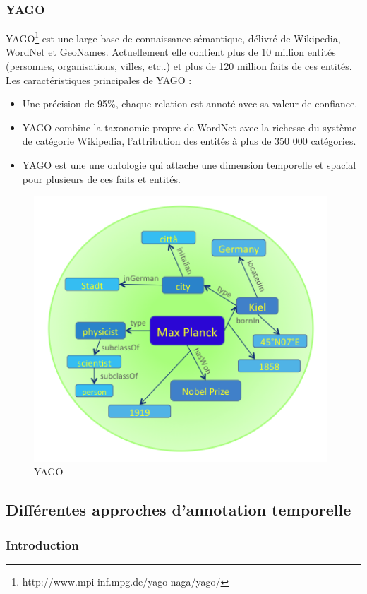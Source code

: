 \documentclass[12pt,a4	]{report}
\begin{document}
\subsubsection*{YAGO}
YAGO\footnote{http://www.mpi-inf.mpg.de/yago-naga/yago/} est une large base de connaissance sémantique, délivré de Wikipedia, WordNet et GeoNames. Actuellement elle contient plus de 10 million entités (personnes, organisations, villes, etc..) et plus de 120 million faits de ces entités.
\newline
Les caractéristiques principales de YAGO :
\begin{itemize}
\item Une précision de 95\%, chaque relation est annoté avec sa valeur de confiance.
\item YAGO combine la taxonomie propre de WordNet avec la richesse du système de catégorie Wikipedia, l'attribution des entités à plus de 350 000 catégories.
\item YAGO est une une ontologie qui attache une dimension temporelle et spacial pour plusieurs de ces faits et entités.
\end{itemize}
\begin{figure}[H]
\centering
\centering
\includegraphics[width=11cm]{yago.png}
\caption{YAGO}

\end{figure}
\subsection*{Différentes approches d'annotation temporelle}			
\subsubsection{Introduction}
\end{document}
